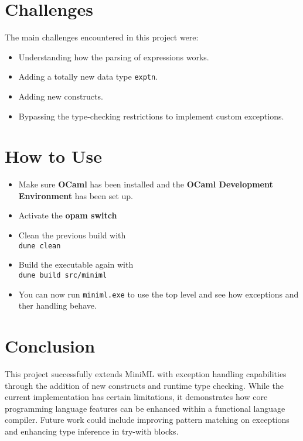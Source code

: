 \documentclass{article}
\begin{document}
\section{Challenges}
    The main challenges encountered in this project were:
    \begin{itemize}
        \item Understanding how the parsing of expressions works.
        \item Adding a totally new data type \texttt{exptn}.
        \item Adding new constructs.
        \item Bypassing the type-checking restrictions to implement custom exceptions.
    \end{itemize}

\section{How to Use}
    \begin{itemize}
        \item Make sure \textbf{OCaml} has been installed and the \textbf{OCaml Development Environment} has been set up.
        \item Activate the \textbf{opam switch}
        \item Clean the previous build with \\\texttt{dune clean}
        \item Build the executable again with \\\texttt{dune build src/miniml}
        \item You can now run \texttt{miniml.exe} to use the top level and see how exceptions and ther handling behave.
    \end{itemize}

\section{Conclusion}
This project successfully extends MiniML with exception handling capabilities through the addition of new constructs and runtime type checking. While the current implementation has certain limitations, it demonstrates how core programming language features can be enhanced within a functional language compiler. Future work could include improving pattern matching on exceptions and enhancing type inference in try-with blocks.
\end{document}
